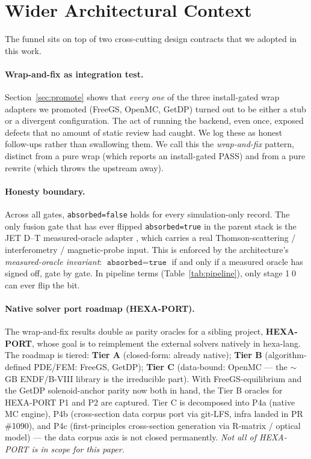 \documentclass[11pt,a4paper]{article}
\begin{document}
\section{Wider Architectural Context}
\label{sec:context}

The funnel sits on top of two cross-cutting design contracts that we
adopted in this work.

\paragraph{Wrap-and-fix as integration test.}
Section~\ref{sec:promote} shows that \emph{every one} of the three
install-gated wrap adapters we promoted (FreeGS, OpenMC, GetDP)
turned out to be either a stub or a divergent configuration. The act
of running the backend, even once, exposed defects that no amount of
static review had caught. We log these as honest follow-ups rather
than swallowing them. We call this the \emph{wrap-and-fix} pattern,
distinct from a pure wrap (which reports an install-gated PASS) and
from a pure rewrite (which throws the upstream away).

\paragraph{Honesty boundary.} Across all gates,
\texttt{absorbed=false} holds for every simulation-only record. The
only fusion gate that has ever flipped \texttt{absorbed=true} in the
parent stack is the JET D--T measured-oracle adapter
\citep{keilhacker1999jet}, which carries a real Thomson-scattering /
interferometry / magnetic-probe input. This is enforced by the
architecture's \emph{measured-oracle invariant}:
$\texttt{absorbed}=\texttt{true}$ if and only if a measured oracle
has signed off, gate by gate. In pipeline terms
(Table~\ref{tab:pipeline}), only stage \textcircled{\scriptsize 10}
can ever flip the bit.

\paragraph{Native solver port roadmap (HEXA-PORT).} The wrap-and-fix
results double as parity oracles for a sibling project,
\textbf{HEXA-PORT}, whose goal is to reimplement the external solvers
natively in hexa-lang. The roadmap is tiered: \textbf{Tier A}
(closed-form: already native); \textbf{Tier B} (algorithm-defined
PDE/FEM: FreeGS, GetDP); \textbf{Tier C} (data-bound: OpenMC --- the
$\sim$GB ENDF/B-VIII library is the irreducible part). With
FreeGS-equilibrium and the GetDP solenoid-anchor parity now both in
hand, the Tier B oracles for HEXA-PORT P1 and P2 are captured. Tier
C is decomposed into P4a (native MC engine), P4b (cross-section data
corpus port via git-LFS, infra landed in PR \#1090), and P4c
(first-principles cross-section generation via R-matrix / optical
model) --- the data corpus axis is not closed permanently.
\emph{Not all of HEXA-PORT is in scope for this paper.}
\end{document}

